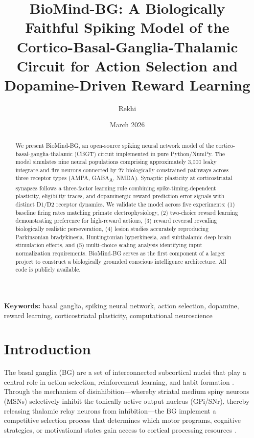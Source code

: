 \documentclass[11pt,a4paper]{article}
\title{BioMind-BG: A Biologically Faithful Spiking Model of the Cortico-Basal-Ganglia-Thalamic Circuit for Action Selection and Dopamine-Driven Reward Learning}
\author{Rekhi}
\affil{Independent Researcher}
\date{March 2026}
\begin{document}
\maketitle

\begin{abstract}
We present BioMind-BG, an open-source spiking neural network model of the cortico-basal-ganglia-thalamic (CBGT) circuit implemented in pure Python/NumPy. The model simulates nine neural populations comprising approximately 3,000 leaky integrate-and-fire neurons connected by 27 biologically constrained pathways across three receptor types (AMPA, GABA\textsubscript{A}, NMDA). Synaptic plasticity at corticostriatal synapses follows a three-factor learning rule combining spike-timing-dependent plasticity, eligibility traces, and dopaminergic reward prediction error signals with distinct D1/D2 receptor dynamics. We validate the model across five experiments: (1) baseline firing rates matching primate electrophysiology, (2) two-choice reward learning demonstrating preference for high-reward actions, (3) reward reversal revealing biologically realistic perseveration, (4) lesion studies accurately reproducing Parkinsonian bradykinesia, Huntingtonian hyperkinesia, and subthalamic deep brain stimulation effects, and (5) multi-choice scaling analysis identifying input normalization requirements. BioMind-BG serves as the first component of a larger project to construct a biologically grounded conscious intelligence architecture. All code is publicly available.
\end{abstract}

\textbf{Keywords:} basal ganglia, spiking neural network, action selection, dopamine, reward learning, corticostriatal plasticity, computational neuroscience

\section{Introduction}

The basal ganglia (BG) are a set of interconnected subcortical nuclei that play a central role in action selection, reinforcement learning, and habit formation \citep{graybiel1998,redgrave1999}. Through the mechanism of disinhibition---whereby striatal medium spiny neurons (MSNs) selectively inhibit the tonically active output nucleus (GPi/SNr), thereby releasing thalamic relay neurons from inhibition---the BG implement a competitive selection process that determines which motor programs, cognitive strategies, or motivational states gain access to cortical processing resources \citep{mink1996,gurney2001}.
\end{document}
